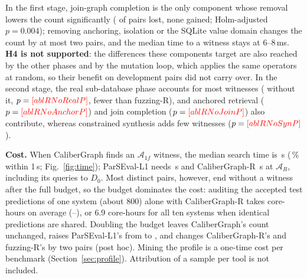 In the first stage, join-graph completion is the only component whose removal lowers the count significantly ( of  pairs lost, none gained; Holm-adjusted $p=0.004$); removing anchoring, isolation or the SQLite value domain changes the count by at most two pairs, and the median time to a witness stays at 6--8\,ms. \textbf{H4 is not supported}: the differences these components target are also reached by the other phases and by the mutation loop, which applies the same operators at random, so their benefit on development pairs did not carry over. In the second stage, the real sub-database phase accounts for most witnesses ( without it, $p=\V{ablRNoRealP}$, fewer than fuzzing-R), and anchored retrieval ($p=\V{ablRNoAnchorP}$) and join completion ($p=\V{ablRNoJoinP}$) also contribute, whereas constrained synthesis adds few witnesses ($p=\V{ablRNoSynP}$).

\textbf{Cost.} When CaliberGraph finds an $\mathcal A_{1f}$ witness, the median search time is \,s (\,\% within 1\,s; Fig.~\ref{fig:time}); ParSEval-L1 needs \,s and CaliberGraph-R \,s at $\mathcal A_R$, including its queries to $D_0$. Most distinct pairs, however, end without a witness after the full budget, so the budget dominates the cost: auditing the accepted test predictions of one system (about 800) alone with CaliberGraph-R takes  core-hours on average (--), or 6.9 core-hours for all ten systems when identical predictions are shared. Doubling the budget leaves CaliberGraph's count unchanged, raises ParSEval-L1's from  to , and changes CaliberGraph-R's and fuzzing-R's by two pairs (post hoc). Mining the profile is a one-time cost per benchmark (Section~\ref{sec:profile}). Attribution of a sample per tool is not included.

